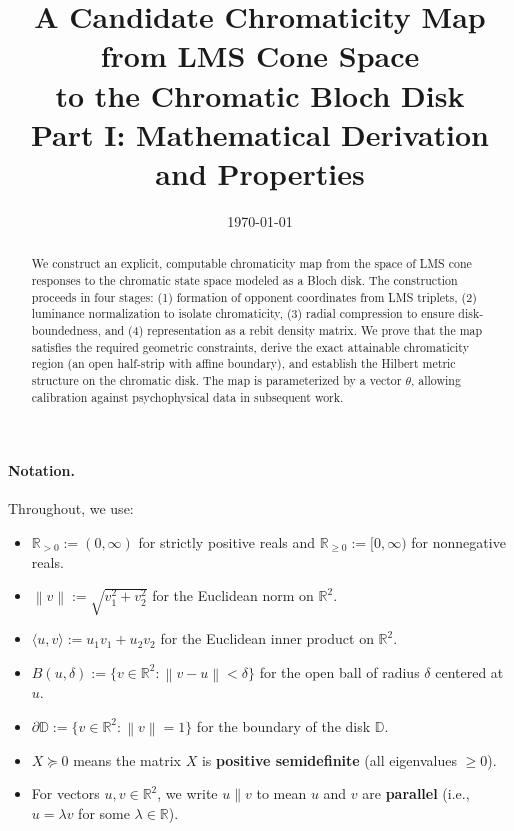\documentclass[11pt]{article}
\title{\textbf{A Candidate Chromaticity Map from LMS Cone Space\\ to the Chromatic Bloch Disk}\\[0.5em]
\large Part I: Mathematical Derivation and Properties}
\author{}
\date{\today}
\theoremstyle{plain}
\theoremstyle{definition}
\theoremstyle{remark}
\newcommand{\R}{\mathbb{R}}
\newcommand{\Rnn}{\mathbb{R}_{\geq 0}}  %
\newcommand{\Rpp}{\mathbb{R}_{> 0}}     %
\newcommand{\D}{\mathbb{D}}
\newcommand{\norm}[1]{\left\lVert #1 \right\rVert}
\newcommand{\inner}[2]{\langle #1, #2 \rangle}
\begin{document}
\maketitle

\begin{abstract}
We construct an explicit, computable chromaticity map from the space of LMS cone responses to the chromatic state space modeled as a Bloch disk. The construction proceeds in four stages: (1) formation of opponent coordinates from LMS triplets, (2) luminance normalization to isolate chromaticity, (3) radial compression to ensure disk-boundedness, and (4) representation as a rebit density matrix. We prove that the map satisfies the required geometric constraints, derive the exact attainable chromaticity region (an open half-strip with affine boundary), and establish the Hilbert metric structure on the chromatic disk. The map is parameterized by a vector $\theta$, allowing calibration against psychophysical data in subsequent work.
\end{abstract}

\paragraph{Notation.} Throughout, we use:
\begin{itemize}
    \item $\Rpp := (0, \infty)$ for strictly positive reals and $\Rnn := [0, \infty)$ for nonnegative reals.
    \item $\norm{v} := \sqrt{v_1^2 + v_2^2}$ for the Euclidean norm on $\R^2$.
    \item $\inner{u}{v} := u_1 v_1 + u_2 v_2$ for the Euclidean inner product on $\R^2$.
    \item $B(u, \delta) := \{v \in \R^2 : \norm{v - u} < \delta\}$ for the open ball of radius $\delta$ centered at $u$.
    \item $\partial \D := \{v \in \R^2 : \norm{v} = 1\}$ for the boundary of the disk $\D$.
    \item $X \succeq 0$ means the matrix $X$ is \textbf{positive semidefinite} (all eigenvalues $\geq 0$).
    \item For vectors $u, v \in \R^2$, we write $u \parallel v$ to mean $u$ and $v$ are \textbf{parallel} (i.e., $u = \lambda v$ for some $\lambda \in \R$).
\end{itemize}

\tableofcontents
\newpage

\end{document}
